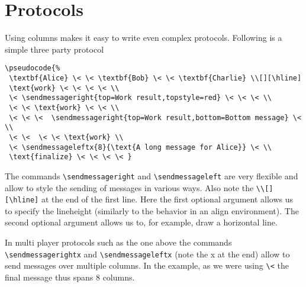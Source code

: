 \documentclass[a4paper]{report}
\begin{document}
\section{Protocols}
Using columns makes it easy to write even complex protocols. Following is a simple
three party protocol
\begin{center}
\end{center}
\begin{lstlisting}
\pseudocode{%
 \textbf{Alice} \< \< \textbf{Bob} \< \< \textbf{Charlie} \\[][\hline]
 \text{work} \< \< \< \< \\
 \< \sendmessageright{top=Work result,topstyle=red} \< \< \< \\
 \< \< \text{work} \< \< \\
 \< \< \<  \sendmessageright{top=Work result,bottom=Bottom message} \< \\
 \< \<  \< \< \text{work} \\
 \< \sendmessageleftx{8}{\text{A long message for Alice}} \< \\
 \text{finalize} \< \< \< \< }
\end{lstlisting}
The commands \lstinline$\sendmessageright$ and \lstinline$\sendmessageleft$ are very flexible and
allow to style the sending of messages in various ways. Also note the \lstinline$\\[][\hline]$ at the end of the
first line. Here the first optional argument allows us to specify the lineheight (similarly to the behavior in an
align environment). The second optional argument allows us to, for example, draw a horizontal line.

In multi player protocols such as the one
above the commands  \lstinline$\sendmessagerightx$ and \lstinline$\sendmessageleftx$ (note the x at the end)
allow to send messages over multiple columns. In the example, as we were using \lstinline$\<$ the
final message thus spans 8 columns. 
\end{document}
